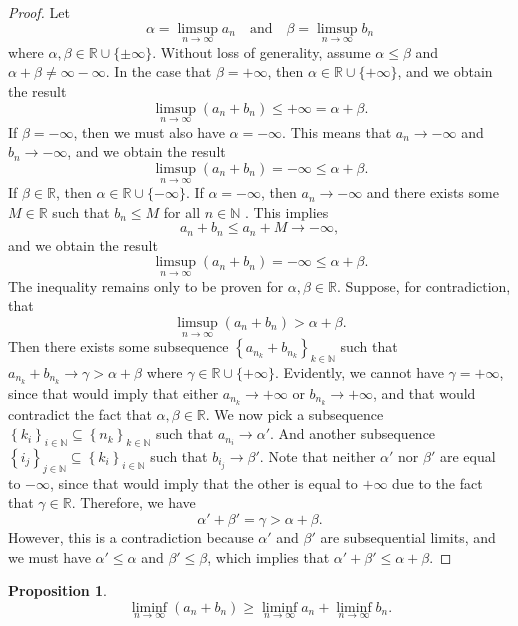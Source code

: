 \documentclass[12pt]{article}
\newtheorem{proposition}{Proposition}
\newcommand{\ds}{\displaystyle}
\newcommand{\isp}[1]{\quad\text{#1}\quad}
\newcommand{\N}{\mathbb{N}} %
\newcommand{\R}{\mathbb{R}} %
\newcommand{\<}{\left\langle} %
\renewcommand{\>}{\right\rangle} %
\newcommand{\seq}[2][n]{\left\{#2\right\}_{#1\in\N}} %
\begin{document}
\begin{proof}
    Let
    \[
        \alpha = \ds\limsup_{n\to \infty} a_n \isp{and} \beta = \ds\limsup_{n\to \infty} b_n
    \]
    where $\alpha, \beta \in \R \cup \{\pm \infty\}$. Without loss of generality, assume $\alpha \leq \beta$ and $\alpha + \beta \ne \infty - \infty$. In the case that $\beta = +\infty$, then $\alpha \in \R\cup\{+\infty\}$, and we obtain the result
    \[
        \limsup _{n\to \infty} (a_n+b_n) \leq + \infty = \alpha + \beta.
    \]
    If $\beta = - \infty$, then we must also have $\alpha = -\infty$. This means that $a_n \to -\infty$ and $b_n \to -\infty$, and we obtain the result
    \[
        \limsup _{n\to \infty} (a_n+b_n) = - \infty \leq \alpha + \beta.
    \]
    If $\beta \in \R$, then $\alpha \in \R \cup\{-\infty\}$. If $\alpha = - \infty$, then $a_n \to -\infty$ and there exists some $M \in \R$ such that $b_n \leq M$ for all $n \in \N$ . This implies
    \[
        a_n + b_n \leq a_n + M \to -\infty,
    \]
    and we obtain the result
    \[
        \limsup _{n\to \infty} (a_n+b_n) = - \infty \leq \alpha + \beta.
    \]
    The inequality remains only to be proven for $\alpha, \beta \in \R$. Suppose, for contradiction, that
    \[
        \limsup _{n\to \infty} (a_n+b_n) > \alpha + \beta.
    \]
    Then there exists some subsequence $\seq[k]{a_{n_k} + b_{n_k}}$ such that $a_{n_k} + b_{n_k} \to \gamma > \alpha + \beta$ where $\gamma \in \R \cup\{+\infty\}$. Evidently, we cannot have $\gamma = +\infty$, since that would imply that either $a_{n_k} \to +\infty$ or $b_{n_k} \to +\infty$, and that would contradict the fact that $\alpha, \beta \in \R$. We now pick a subsequence $\seq[i]{k_i} \subseteq \seq[k]{n_k}$ such that $a_{n_i} \to \alpha'$. And another subsequence $\seq[j]{i_j} \subseteq \seq[i]{k_i}$ such that $b_{i_j} \to \beta'$. Note that neither $\alpha'$ nor $\beta'$ are equal to $-\infty$, since that would imply that the other is equal to $+\infty$ due to the fact that $\gamma \in \R$. Therefore, we have
    \[
        \alpha' + \beta' = \gamma > \alpha + \beta.
    \]
    However, this is a contradiction because $\alpha'$ and $\beta'$ are subsequential limits, and we must have $\alpha' \leq \alpha$ and $\beta' \leq \beta$, which implies that $\alpha' + \beta' \leq \alpha + \beta$.
    
\end{proof}

\begin{proposition}
    \[
        \liminf _{n\to \infty} (a_n+b_n) \geq \liminf _{n\to \infty} a_n +\liminf _{n\to \infty} b_n.
    \]
\end{proposition}
\end{document}
